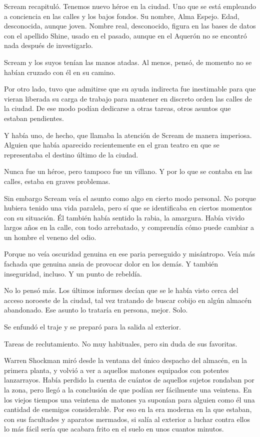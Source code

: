 Scream recapituló. Tenemos nuevo héroe en la ciudad. Uno que se está empleando a conciencia en las calles y los bajos fondos. Su nombre, Alma Espejo. Edad, desconocida, aunque joven. Nombre real, desconocido, figura en las bases de datos con el apellido Shine, usado en el pasado, aunque en el Aquerón no se encontró nada después de investigarlo.

Scream y los suyos tenían las manos atadas. Al menos, pensó, de momento no se habían cruzado con él en su camino.

Por otro lado, tuvo que admitirse que su ayuda indirecta fue inestimable para que vieran liberada su carga de trabajo para mantener en discreto orden las calles de la ciudad. De ese modo podían dedicarse a otras tareas, otros asuntos que estaban pendientes.

Y había uno, de hecho, que llamaba la atención de Scream de manera imperiosa. Alguien que había aparecido recientemente en el gran teatro en que se representaba el destino último de la ciudad.

Nunca fue un héroe, pero tampoco fue un villano. Y por lo que se contaba en las calles, estaba en graves problemas.

Sin embargo Scream veía el asunto como algo en cierto modo personal. No porque hubiera tenido una vida paralela, pero sí que se identificaba en ciertos momentos con su situación. Él también había sentido la rabia, la amargura. Había vivido largos años en la calle, con todo arrebatado, y comprendía cómo puede cambiar a un hombre el veneno del odio.

Porque no veía oscuridad genuina en ese paria perseguido y misántropo. Veía más fachada que genuina ansia de provocar dolor en los demás. Y también inseguridad, incluso. Y un punto de rebeldía.

No lo pensó más. Los últimos informes decían que se le había visto cerca del acceso noroeste de la ciudad, tal vez tratando de buscar cobijo en algún almacén abandonado. Ese asunto lo trataría en persona, mejor. Solo.

Se enfundó el traje y se preparó para la salida al exterior.

Tareas de reclutamiento. No muy habituales, pero sin duda de sus favoritas.

\parbreak
Warren Shockman miró desde la ventana del único despacho del almacén, en la primera planta, y volvió a ver a aquellos matones equipados con potentes lanzarrayos. Había perdido la cuenta de cuántos de aquellos sujetos rondaban por la zona, pero llegó a la conclusión de que podían ser fácilmente una veintena. En los viejos tiempos una veintena de matones ya suponían para alguien como él una cantidad de enemigos considerable. Por eso en la era moderna en la que estaban, con sus facultades y aparatos mermados, si salía al exterior a luchar contra ellos lo más fácil sería que acabara frito en el suelo en unos cuantos minutos.

